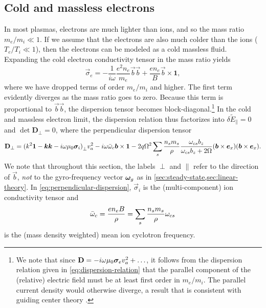 \documentclass[aps,pre,notitlepage,amsmath,amssymb,amsfonts,nobibnotes,nofootinbib,superscriptaddress]{revtex4-1}
\begin{document}
\subsection{Cold and massless electrons}
\label{sec:cold-e}

In most plasmas, electrons are much lighter than ions, and so the mass ratio
$m_e/m_i\ll1$. If we assume that the electrons are also much colder than the
ions ($T_e/T_i\ll1$), then the electrons can be modeled as a cold massless
fluid. Expanding the cold electron conductivity tensor in the mass ratio
yields
\begin{equation}
  \label{eq:cold-electron-conductivity}
  \vec{\sigma}_e = -\frac{1}{i\omega}\frac{e^2n_e}{m_e}\vec{b}\vec{b}
  + \frac{en_e}{B}\vec{b}\times\mathbf{1},
\end{equation}
where we have dropped terms of order $m_e/m_i$ and higher. The first term
evidently diverges as the mass ratio goes to zero. Because this term is
proportional to $\vec{b}\vec{b}$, the dispersion tensor becomes
block-diagonal.\footnote{We note that since
  $\mathbf{D}=-i\omega\mu_0\bm{\sigma}_ev_a^2+\ldots$, it follows from the
  dispersion relation given in \cref{eq:dispersion-relation} that the parallel
  component of the (relative) electric field must be at least first order in
  $m_e/m_i$. The parallel current density would otherwise diverge, a result
  that is consistent with guiding center theory \citep[e.g.][]{Grad1961}.} In
the cold and massless electron limit, the dispersion relation thus factorizes
into $\delta{}\tilde{E}_\parallel=0$ and $\det\mathbf{D}_\perp=0$, where the
perpendicular dispersion tensor
\begin{equation}
  \label{eq:perpendicular-dispersion}
  \mathbf{D}_\perp =
  {(k^2\mathbf{1} - \vec{k}\vec{k} - i\omega\mu_0\vec{\sigma}_i)}_\perp\va^2
  - i\omega\ome\vec{b}\times\mathbf{1}
  - 2q\Omega^2\sums\frac{n_s{}m_s}{\rho}\frac{\omcs b_z}{\omcs b_z + 2\Omega}
  (\vec{b}\times\ex)(\vec{b}\times\ex).
\end{equation}
We note that throughout this section, the labels $\perp$ and $\parallel$ refer
to the direction of $\vec{b}$, \emph{not} to the gyro-frequency vector $\bm{\omega}_g$
as in \cref{sec:steady-state,sec:linear-theory}. In
\cref{eq:perpendicular-dispersion}, $\vec{\sigma}_i$ is the (multi-component)
ion conductivity tensor and
\begin{equation}
  \bar{\omega}_c = \frac{en_e B}{\rho} = \sum_s\frac{n_s m_s}{\rho}\omega_{cs}
\end{equation}
is the (mass density weighted) mean ion cyclotron frequency.
\end{document}
